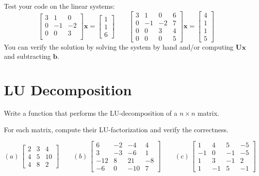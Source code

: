 \begin{exercise}
    Test your code on the linear systems:
    $$
    \begin{bmatrix}
      3 & 1 & 0  \\
      0 & -1 & -2  \\
      0 & 0 & 3  \\
    \end{bmatrix} \mathbf{x} = \begin{bmatrix}
      1 \\ 1 \\ 6
    \end{bmatrix}
    \qquad
    \begin{bmatrix}
      3 & 1 & 0 & 6 \\
      0 & -1 & -2 & 7 \\
      0 & 0 & 3 & 4 \\
      0 & 0 & 0 & 5
    \end{bmatrix} \mathbf{x} = \begin{bmatrix}
      4 \\ 1 \\ 1 \\ 5
    \end{bmatrix}
    $$
    You can verify the solution by solving the system by hand and/or computing $\mathbf{U}\mathbf{x}$ and subtracting $\mathbf{b}$.
\end{exercise}

\section{LU Decomposition}

\begin{exercise}
    Write a function that performs the LU-decomposition of a $n\times n$ matrix. 
\end{exercise}

\begin{exercise}\label{LU Factorization}
    For each matrix, compute their LU-factorization and verify the correctness.

    $$
        (a) \, \begin{bmatrix}
            2 & 3 & 4 \\
            4 & 5 & 10 \\
            4 & 8 & 2
        \end{bmatrix}\qquad
        (b) \, \begin{bmatrix}
            6 & -2 & -4 & 4\\
            3 & -3 & -6 & 1 \\
            -12 & 8 & 21 & -8 \\
            -6 & 0 & -10 & 7
        \end{bmatrix}\qquad
        (c) \, \begin{bmatrix}
            1 & 4 & 5 & -5 \\
            -1 & 0 & -1 & -5 \\
            1 & 3 & -1 & 2 \\
            1 & -1 & 5 & -1 
        \end{bmatrix}
    $$
\end{exercise}

